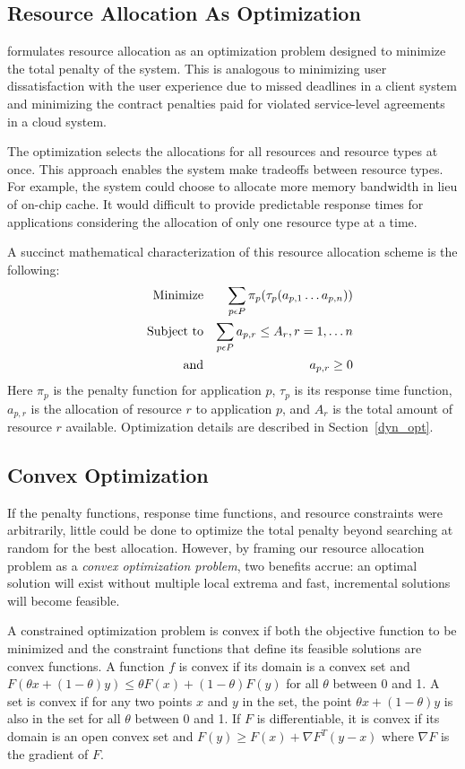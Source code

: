 \subsection*{Resource Allocation As Optimization}
\pacora formulates resource allocation as an optimization problem designed to minimize the total penalty of the system. This is analogous to minimizing user dissatisfaction with the user experience due to missed deadlines in a client system and minimizing the contract penalties paid for violated service-level agreements in a cloud system. 

The optimization selects the allocations for all resources and resource types at once.  This approach enables the system make tradeoffs between resource types.  For example, the system could choose to allocate more memory bandwidth in lieu of on-chip cache.  It would difficult to provide predictable response times for applications considering the allocation of only one resource type at a time.

A succinct mathematical characterization of this resource allocation scheme is the following:
\begin{eqnarray*}
& \makebox[1in][r]{Minimize}   & \sum_{p\epsilon P} {\pi_p(\tau_p(a_{p,1}\ldots a_{p,n}))}  \\
& \makebox[1in][r]{Subject to} & \sum_{p\epsilon P} a_{p,r} \leq A_r, r = 1,\ldots n        \\
& \makebox[1in][r]{and}        & a_{p,r} \geq 0
\end{eqnarray*}
Here $\pi_p$ is the penalty function for application $p$,
$\tau_p$ is its response time function,
$a_{p,r}$ is the allocation of resource $r$ to application $p$,
and $A_r$ is the total amount of resource $r$ available.  Optimization details are described in Section~\ref{dyn_opt}.

\subsection*{Convex Optimization}

If the penalty functions, response time functions, and resource constraints were arbitrarily,
little could be done to optimize the total penalty beyond searching at random for the best allocation.
However, by framing our resource allocation problem as a \emph{convex optimization problem}\cite{BoVa},
two benefits accrue: an optimal solution will exist without multiple local extrema and
fast, incremental solutions will become feasible.

A constrained optimization problem is convex if both the objective function to be minimized
and the constraint functions that define its feasible solutions are convex functions.
A function $f$ is convex if its domain is a convex set and
$F(\theta x + (1-\theta)y) \leq \theta F(x) + (1-\theta)F(y)$
for all $\theta$ between 0 and 1.
A set is convex if for any two points $x$ and $y$ in the set, the point
$\theta x + (1-\theta)y$
is also in the set for all $\theta$ between 0 and 1.
If $F$ is differentiable, it is convex if its domain is an open convex set and
$F(y) \geq F(x) + \nabla F^T(y-x)$ where $\nabla F$ is the gradient of $F$.

